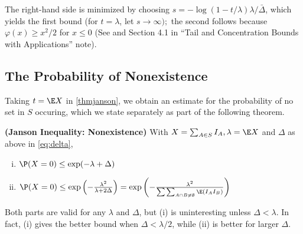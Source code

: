 \documentclass{article}
\newcommand{\bfs}[1]{\textbf{({#1})}}
\begin{document}
The right-hand side is minimized by choosing $s=-\log (1-t / \lambda) \lambda / \bar{\Delta}$, which yields the first bound (for $t=\lambda$, let $s \rightarrow \infty) ;$ the second follows because $\varphi(x) \geq x^{2} / 2$ for $x \leq 0$ (See \cite[p.22 Corollary 2.2.]{janson2011random} and Section 4.1 in ``Tail and Concentration Bounds with Applications'' note).

\subsection{The Probability of Nonexistence}

Taking $t= \E X$ in \cref{thmjanson}, we obtain an estimate for the probability of no set in $S$ occuring, which we state separately as part of the following theorem. 
\begin{thma}{\bfs{Janson Inequality: Nonexistence}}\label{thm:non}
With $X=\sum_{A \in S } I_{A}, \lambda= \E X$ and $\Delta$ as above in \cref{eq:delta},
\begin{enumerate}[(i)]
    \item $\P (X=0) \leq \exp (-\lambda+\Delta)$
    \item $\P (X=0) \leq \exp \left(-\frac{\lambda^{2}}{\lambda+2 \Delta}\right)=\exp \left(-\frac{\lambda^{2}}{\sum \sum_{A \cap B \neq \emptyset} \E \left(I_{A} I_{B}\right)}\right)$
\end{enumerate}
\end{thma} 
\begin{rema}
 Both parts are valid for any $\lambda$ and $\Delta$, but (i) is uninteresting unless $\Delta<\lambda$. In fact, (i) gives the better bound when $\Delta<\lambda / 2$, while (ii) is better for larger $\Delta$.
\end{rema}
\end{document}
